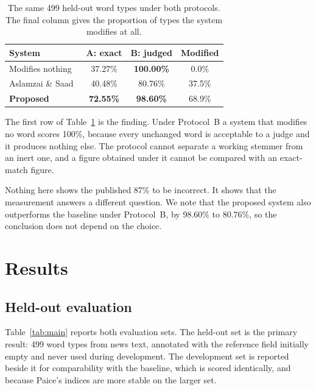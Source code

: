 \documentclass[conference]{IEEEtran}
\begin{document}
\begin{table}[t]
\caption{The same 499 held-out word types under both protocols. The final
column gives the proportion of types the system modifies at all.}
\label{tab:protocol}
\centering
\begin{tabular}{lccc}
\toprule
System & A: exact & B: judged & Modified\\
\midrule
Modifies nothing       & 37.27\% & \textbf{100.00\%} & 0.0\%\\
Aslamzai \& Saad~\cite{aslamzai2015} & 40.48\% & 80.76\% & 37.5\%\\
\textbf{Proposed}      & \textbf{72.55\%} & \textbf{98.60\%} & 68.9\%\\
\bottomrule
\end{tabular}
\end{table}

The first row of Table~\ref{tab:protocol} is the finding. Under Protocol~B a
system that modifies no word scores 100\%, because every unchanged word is
acceptable to a judge and it produces nothing else. The protocol cannot
separate a working stemmer from an inert one, and a figure obtained under it
cannot be compared with an exact-match figure.

Nothing here shows the published 87\% to be incorrect. It shows that the
measurement answers a different question. We note that the proposed system
also outperforms the baseline under Protocol~B, by 98.60\% to 80.76\%, so the
conclusion does not depend on the choice.

\section{Results}
\label{sec:results}

\subsection{Held-out evaluation}

Table~\ref{tab:main} reports both evaluation sets. The held-out set is the
primary result: 499 word types from news text, annotated with the reference
field initially empty and never used during development. The development set is
reported beside it for comparability with the baseline, which is scored
identically, and because Paice's indices are more stable on the larger set.
\end{document}

